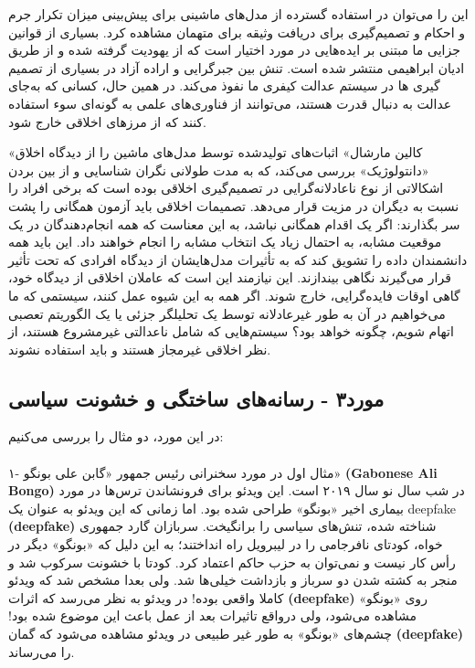 این را می‌توان در استفاده گسترده از مدل‌های ماشینی برای پیش‌بینی میزان تکرار جرم و احکام و تصمیم‌گیری برای دریافت وثیقه برای متهمان مشاهده کرد.
بسیاری از قوانین جزایی ما مبتنی بر ایده‌هایی در مورد اختیار است که از یهودیت گرفته شده و از طریق ادیان ابراهیمی منتشر شده است.
تنش بین جبرگرایی و اراده آزاد در بسیاری از تصمیم گیری ها در سیستم عدالت کیفری ما نفوذ می‌کند.
در همین حال، کسانی که به‌جای عدالت به دنبال قدرت هستند، می‌توانند از فناوری‌های علمی به گونه‌ای سوء استفاده کنند که از مرزهای اخلاقی خارج شود.

«کالین مارشال» اثبات‌های تولیدشده توسط مدل‌های ماشین را از دیدگاه اخلاق «دانتولوژیک» بررسی می‌کند، که به مدت طولانی نگران شناسایی و از بین بردن اشکالاتی از نوع ناعادلانه‌گرایی در تصمیم‌گیری اخلاقی بوده است که برخی افراد را نسبت به دیگران در مزیت قرار می‌دهد.
تصمیمات اخلاقی باید آزمون همگانی را پشت سر بگذارند: اگر یک اقدام همگانی نباشد، به این معناست که همه انجام‌دهندگان در یک موقعیت مشابه، به احتمال زیاد یک انتخاب مشابه را انجام خواهند داد.
این باید همه دانشمندان داده را تشویق کند که به تأثیرات مدل‌هایشان از دیدگاه افرادی که تحت تأثیر قرار می‌گیرند نگاهی بیندازند.
این نیازمند این است که عاملان اخلاقی از دیدگاه خود، گاهی اوقات فایده‌گرایی، خارج شوند.
اگر همه به این شیوه عمل کنند، سیستمی که ما می‌خواهیم در آن به طور غیرعادلانه توسط یک تحلیلگر جزئی یا یک الگوریتم تعصبی اتهام شویم، چگونه خواهد بود؟ سیستم‌هایی که شامل ناعدالتی غیرمشروع هستند، از نظر اخلاقی غیرمجاز هستند و باید استفاده نشوند.
\newline
\newline

{
\subsection*{مورد۳ - رسانه‌های ساختگی و خشونت سیاسی}
\label{subsec:مورد۳ - رسانه‌های ساختگی و خشونت سیاسی}
در این مورد، دو مثال را بررسی می‌کنیم:
}

\paragraph{}
۱- مثال اول در مورد سخنرانی رئیس جمهور «گابن علی بونگو» \textenglish{\textbf{(Gabonese Ali Bongo)}} در شب سال نو سال ۲۰۱۹ است.
این ویدئو برای فرونشاندن ترس‌ها در مورد بیماری اخیر «بونگو» طراحی شده بود.
اما زمانی که این ویدئو به عنوان یک deepfake \textenglish{\textbf{(deepfake)}} شناخته شده، تنش‌های سیاسی را برانگیخت.
سربازان گارد جمهوری خواه، کودتای نافرجامی را در لیبرویل راه انداختند؛ به این دلیل که «بونگو» دیگر در رأس کار نیست و نمی‌توان به حزب حاکم اعتماد کرد.
کودتا با خشونت سرکوب شد و منجر به کشته شدن دو سرباز و بازداشت خیلی‌ها شد.
ولی بعدا مشخص شد که ویدئو کاملا واقعی بوده!
در ویدئو به نظر می‌رسد که اثرات \textenglish{\textbf{(deepfake)}} روی «بونگو» مشاهده می‌شود، ولی درواقع تاثیرات بعد از عمل باعث این موضوع شده بود!
چشم‌های «بونگو» به طور غیر طبیعی در ویدئو مشاهده می‌شود که گمان \textenglish{\textbf{(deepfake)}} را می‌رساند.

